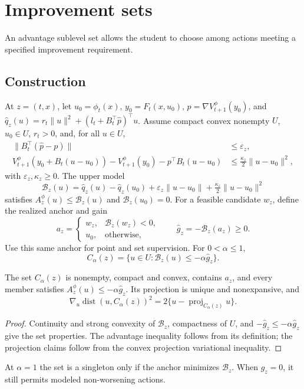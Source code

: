 \section{Improvement sets}\label{sec:sets}
An advantage sublevel set allows the student to choose among actions
meeting a specified improvement requirement.

\subsection{Construction}
At $z=(t,x)$, let $u_0=\phi_t(x)$, $y_0=F_t(x,u_0)$,
$p=\nabla V^\phi_{t+1}(y_0)$, and
$\widehat q_z(u)=r_t\|u\|^2+(l_t+B_t^\top\widehat p)^\top u$.
Assume compact convex nonempty $U$, $u_0\in U$, $r_t>0$, and, for all
$u\in U$,
\begin{align}
 \|B_t^\top(\widehat p-p)\|&\leq\varepsilon_z,\\
 V^\phi_{t+1}(y_0+B_t(u-u_0))-V^\phi_{t+1}(y_0)
 -p^\top B_t(u-u_0)&\leq\tfrac{\kappa_z}{2}\|u-u_0\|^2,
\end{align}
with $\varepsilon_z,\kappa_z\geq0$. The upper model
\begin{equation}\label{eq:set-model}
 \mathcal B_z(u)=\widehat q_z(u)-\widehat q_z(u_0)
 +\varepsilon_z\|u-u_0\|+\tfrac{\kappa_z}{2}\|u-u_0\|^2
\end{equation}
satisfies $A_z^\phi(u)\leq\mathcal B_z(u)$ and $\mathcal B_z(u_0)=0$.
For a feasible candidate $w_z$, define the realized anchor and gain
\begin{equation}
 a_z=\begin{cases}w_z,&\mathcal B_z(w_z)<0,\\u_0,&\text{otherwise},\end{cases}
 \qquad\widehat g_z=-\mathcal B_z(a_z)\geq0.
\end{equation}
Use this same anchor for point and set supervision. For $0<\alpha\leq1$,
\begin{equation}\label{eq:improving-set}
 C_\alpha(z)=\{u\in U:\mathcal B_z(u)\leq-\alpha\widehat g_z\}.
\end{equation}
\begin{proposition}\label{prop:set}
The set $C_\alpha(z)$ is nonempty, compact and convex, contains $a_z$,
and every member satisfies $A_z^\phi(u)\leq-\alpha\widehat g_z$.
Its projection is unique and nonexpansive, and
\begin{equation}\label{eq:set-gradient}
 \nabla_u\operatorname{dist}(u,C_\alpha(z))^2
 =2\{u-\operatorname{proj}_{C_\alpha(z)}u\}.
\end{equation}
\end{proposition}
\begin{proof}
Continuity and strong convexity of $\mathcal B_z$, compactness of $U$,
and $-\widehat g_z\leq-\alpha\widehat g_z$ give the set properties.
The advantage inequality follows from its definition; the projection
claims follow from the convex projection variational inequality.
\end{proof}
At $\alpha=1$ the set is a singleton only if the anchor minimizes
$\mathcal B_z$. When $\widehat g_z=0$, it still permits modeled
non-worsening actions.

